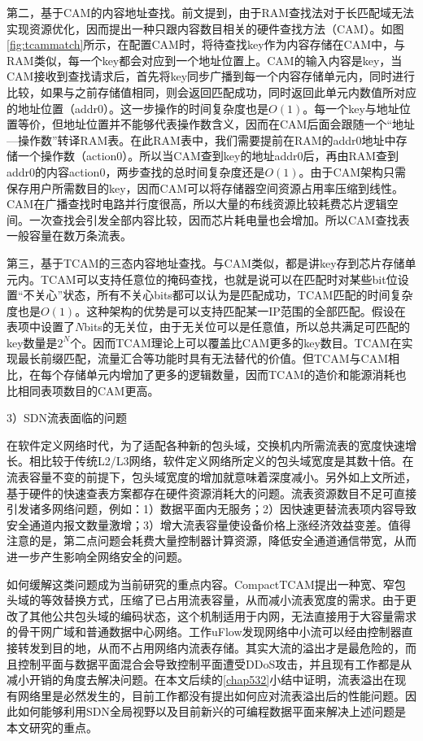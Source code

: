 第二，基于CAM的内容地址查找。前文提到，由于RAM查找法对于长匹配域无法实现资源优化，因而提出一种只跟内容数目相关的硬件查找方法（CAM）。如图\ref{fig:tcammatch}所示，在配置CAM时，将待查找key作为内容存储在CAM中，与RAM类似，每一个key都会对应到一个地址位置上。CAM的输入内容是key，当CAM接收到查找请求后，首先将key同步广播到每一个内容存储单元内，同时进行比较，如果与之前存储值相同，则会返回匹配成功，同时返回此单元内数值所对应的地址位置（addr0）。这一步操作的时间复杂度也是$O(1)$。每一个key与地址位置等价，但地址位置并不能够代表操作数含义，因而在CAM后面会跟随一个“地址---操作数”转译RAM表。在此RAM表中，我们需要提前在RAM的addr0地址中存储一个操作数（action0）。所以当CAM查到key的地址addr0后，再由RAM查到addr0的内容action0，两步查找的总时间复杂度还是$O(1)$。由于CAM架构只需保存用户所需数目的key，因而CAM可以将存储器空间资源占用率压缩到线性。CAM在广播查找时电路并行度很高，所以大量的布线资源比较耗费芯片逻辑空间。一次查找会引发全部内容比较，因而芯片耗电量也会增加。所以CAM查找表一般容量在数万条流表。

第三，基于TCAM的三态内容地址查找。与CAM类似，都是讲key存到芯片存储单元内。TCAM可以支持任意位的掩码查找，也就是说可以在匹配时对某些bit位设置“不关心”状态，所有不关心bits都可以认为是匹配成功，TCAM匹配的时间复杂度也是$O(1)$。这种架构的优势是可以支持匹配某一IP范围的全部匹配。假设在表项中设置了$N$bits的无关位，由于无关位可以是任意值，所以总共满足可匹配的key数量是$2^{N}$个。因而TCAM理论上可以覆盖比CAM更多的key数目。TCAM在实现最长前缀匹配，流量汇合等功能时具有无法替代的价值。但TCAM与CAM相比，在每个存储单元内增加了更多的逻辑数量，因而TCAM的造价和能源消耗也比相同表项数目的CAM更高。


3）SDN流表面临的问题

在软件定义网络时代，为了适配各种新的包头域，交换机内所需流表的宽度快速增长。相比较于传统L2/L3网络，软件定义网络所定义的包头域宽度是其数十倍。在流表容量不变的前提下，包头域宽度的增加就意味着深度减小。另外如上文所述，基于硬件的快速查表方案都存在硬件资源消耗大的问题。流表资源数目不足可直接引发诸多网络问题，例如：1）数据平面内无服务；2）因快速更替流表项内容导致安全通道内报文数量激增；3）增大流表容量使设备价格上涨经济效益变差。值得注意的是，第二点问题会耗费大量控制器计算资源，降低安全通道通信带宽，从而进一步产生影响全网络安全的问题。

如何缓解这类问题成为当前研究的重点内容。CompactTCAM提出一种宽、窄包头域的等效替换方式，压缩了已占用流表容量，从而减小流表宽度的需求。由于更改了其他公共包头域的编码状态，这个机制适用于内网，无法直接用于大容量需求的骨干网广域和普通数据中心网络。工作uFlow发现网络中小流可以经由控制器直接转发到目的地，从而不占用网络内流表存储。其实大流的溢出才是最危险的，而且控制平面与数据平面混合会导致控制平面遭受DDoS攻击，并且现有工作都是从减小开销的角度去解决问题。在本文后续的\ref{chap532}小结中证明，流表溢出在现有网络里是必然发生的，目前工作都没有提出如何应对流表溢出后的性能问题。因此如何能够利用SDN全局视野以及目前新兴的可编程数据平面来解决上述问题是本文研究的重点。


